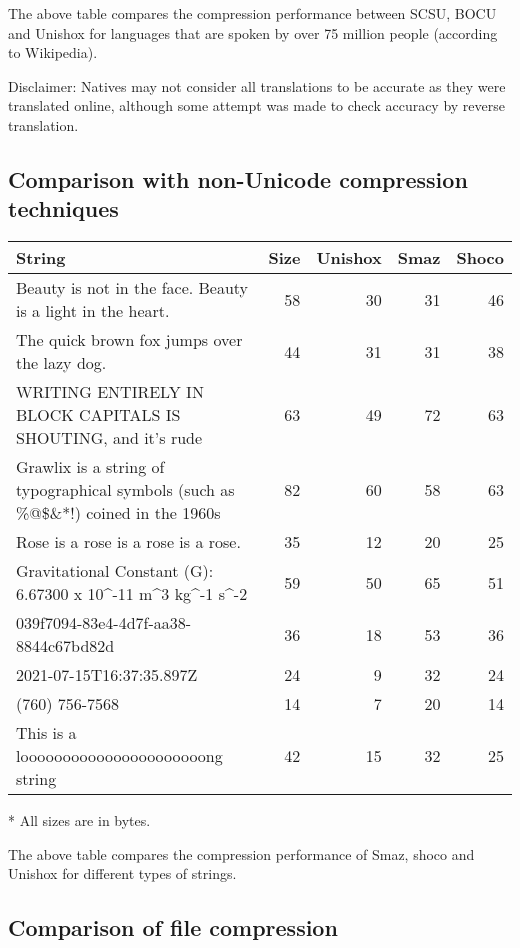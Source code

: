 \documentclass[]{article}
\begin{document}
	The above table compares the compression performance between SCSU, BOCU and Unishox for languages that are spoken by over 75 million people (according to Wikipedia).
	
	Disclaimer: Natives may not consider all translations to be accurate as they were translated online, although some attempt was made to check accuracy by reverse translation.
	
	\subsection{Comparison with non-Unicode compression techniques}
	
	\begin{tabular}{ | p{} | r | r | r | r |} \hline
		\textbf{String} & \textbf{Size} & \textbf{Unishox} & \textbf{Smaz} & \textbf{Shoco} \\ \hline
		Beauty is not in the face. Beauty is a light in the heart. & 58 & 30 & 31 & 46 \\ \hline
		The quick brown fox jumps over the lazy dog. & 44 & 31 & 31 & 38 \\ \hline
		WRITING ENTIRELY IN BLOCK CAPITALS IS SHOUTING, and it’s rude & 63 & 49 & 72 & 63 \\ \hline
		Grawlix is a string of typographical symbols (such as \%@\$\&*!) coined in the 1960s & 82 & 60 & 58 & 63 \\ \hline
		Rose is a rose is a rose is a rose. & 35 & 12 & 20 & 25 \\ \hline
		Gravitational Constant (G): 6.67300 x 10\^{}-11 m\^{}3 kg\^{}-1 s\^{}-2 & 59 & 50 & 65 & 51 \\ \hline
		039f7094-83e4-4d7f-aa38-8844c67bd82d & 36 & 18 & 53 & 36 \\ \hline
		2021-07-15T16:37:35.897Z & 24 & 9 & 32 & 24 \\ \hline
		(760) 756-7568 & 14 & 7 & 20 & 14 \\ \hline
		This is a loooooooooooooooooooooong string & 42 & 15 & 32 & 25 \\ \hline
	\end{tabular}
	* All sizes are in bytes.
	
	The above table compares the compression performance of Smaz, shoco and Unishox for different types of strings.
	
	\subsection{Comparison of file compression}
	
\end{document}
